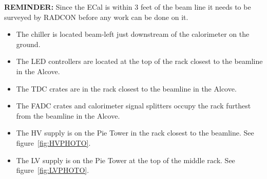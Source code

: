 \documentclass[12pt]{article}
\begin{document}
{\bf REMINDER:} Since the ECal is within 3 feet of the beam line it needs to be surveyed by RADCON before any work can be done on it.
   {\footnotesize
\begin{itemize}
\item
The chiller is located beam-left just downstream of the calorimeter on the ground.
\item
The LED controllers are located at the top of the rack closest to the beamline in the Alcove.
\item
The TDC crates are in the rack closest to the beamline in the Alcove.
\item
The FADC crates and calorimeter signal splitters occupy the rack furthest from the beamline in the Alcove.
\item
    The HV supply is on the Pie Tower in the rack closest to the beamline.  See figure~\ref{fig:HVPHOTO}.
\item
    The LV supply is on the Pie Tower at the top of the middle rack. See figure~\ref{fig:LVPHOTO}.
\end{itemize}

}
\end{document}
